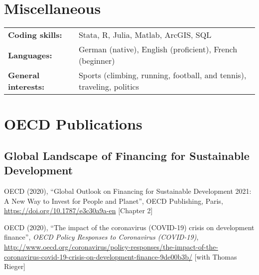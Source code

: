 \documentclass[a4paper, english, 10pt]{cv_class}
\begin{document}

\section{Miscellaneous}

\vspace{-12pt}
\begin{table}[h!]
	\begin{tabular}{ll}
		\textbf{Coding skills:} & Stata, R, Julia, Matlab, ArcGIS, SQL \\ 
		\textbf{Languages:} & German (native), English (proficient), French (beginner) \\
		\textbf{General interests:} & Sports (climbing, running, football, and tennis), traveling, politics
	\end{tabular}
\end{table}
\vspace{-12pt}

\newpage 
\section{OECD Publications}

\setlength{\parskip}{9pt}

\subsection{Global Landscape of Financing for Sustainable Development}

OECD (2020), ``Global Outlook on Financing for Sustainable Development 2021: A New Way to Invest for People and Planet'', OECD Publishing, Paris, \url{https://doi.org/10.1787/e3c30a9a-en} [Chapter 2]

OECD (2020), ``The impact of the coronavirus (COVID-19) crisis on development finance'', \textit{OECD Policy Responses to Coronavirus (COVID-19)}, \url{http://www.oecd.org/coronavirus/policy-responses/the-impact-of-the-coronavirus-covid-19-crisis-on-development-finance-9de00b3b/} [with Thomas Rieger]
\end{document}
